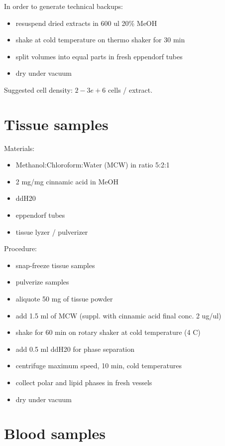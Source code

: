 \documentclass[]{book}
\providecommand{\tightlist}{%
  \setlength{\itemsep}{0pt}\setlength{\parskip}{0pt}}
\theoremstyle{definition}
\theoremstyle{definition}
\theoremstyle{definition}
\theoremstyle{remark}
\begin{document}
In order to generate technical backups:

\begin{itemize}
\tightlist
\item
  resuspend dried extracts in 600 ul 20\% MeOH
\item
  shake at cold temperature on thermo shaker for 30 min
\item
  split volumes into equal parts in fresh eppendorf tubes
\item
  dry under vacuum
\end{itemize}

Suggested cell density: \(2-3e+6\) cells / extract.

\section{Tissue samples}\label{tissue-samples}

Materials:

\begin{itemize}
\tightlist
\item
  Methanol:Chloroform:Water (MCW) in ratio 5:2:1
\item
  2 mg/mg cinnamic acid in MeOH
\item
  ddH20
\item
  eppendorf tubes
\item
  tissue lyzer / pulverizer
\end{itemize}

Procedure:

\begin{itemize}
\tightlist
\item
  snap-freeze tissue samples
\item
  pulverize samples
\item
  aliquote 50 mg of tissue powder
\item
  add 1.5 ml of MCW (suppl. with cinnamic acid final conc. 2 ug/ul)
\item
  shake for 60 min on rotary shaker at cold temperature (4 C)
\item
  add 0.5 ml ddH20 for phase separation
\item
  centrifuge maximum speed, 10 min, cold temperatures
\item
  collect polar and lipid phases in fresh vessels
\item
  dry under vacuum
\end{itemize}

\section{Blood samples}\label{blood-samples}
\end{document}
